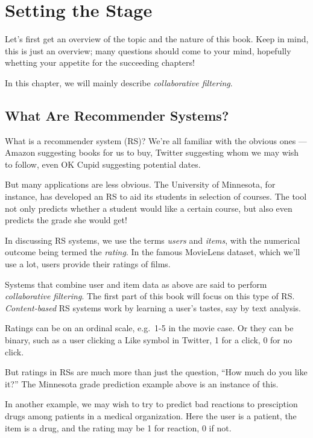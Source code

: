\chapter{Setting the Stage}  
\label{chap:prologue} 

Let's first get an overview of the topic and the nature of this book.
Keep in mind, this is just an overview; many questions should come to
your mind, hopefully whetting your appetite for the succeeding chapters!

In this chapter, we will mainly describe \textit{collaborative
filtering}. 

\section{What Are Recommender Systems?}

What is a recommender system (RS)?  We're all familiar with the obvious
ones --- Amazon suggesting books for us to buy, Twitter suggesting whom
we may wish to follow, even OK Cupid suggesting potential dates. 

But many applications are less obvious.  The University of Minnesota,
for instance, has developed an RS to aid its students in selection of
courses.  The tool not only predicts whether a student would like a
certain course, but also even predicts the grade she would get!

In discussing RS systems, we use the terms \textit{users} and
\textit{items}, with the numerical outcome being
termed the \textit{rating}.  In the famous MovieLens dataset, which
we'll use a lot, users provide their ratings of films.

Systems that combine user and item data as above are said to perform
\textit{collaborative filtering}.  The first part of this book will
focus on this type of RS.  \textit{Content-based} RS systems work by
learning a user's tastes, say by text analysis.

Ratings can be on an ordinal scale, e.g.\ 1-5 in the movie case.  Or 
they can be binary, such as a user clicking a Like symbol in Twitter, 1 for a
click, 0 for no click.

But ratings in RSs are much more than just the question, ``How much do
you like it?''  The Minnesota grade prediction example above is an
instance of this.

In another example, we may wish to try to predict bad reactions to
presciption drugs among patients in a medical organization.  Here the
user is a patient, the item is a drug, and the rating may be 1 for
reaction, 0 if not.  

